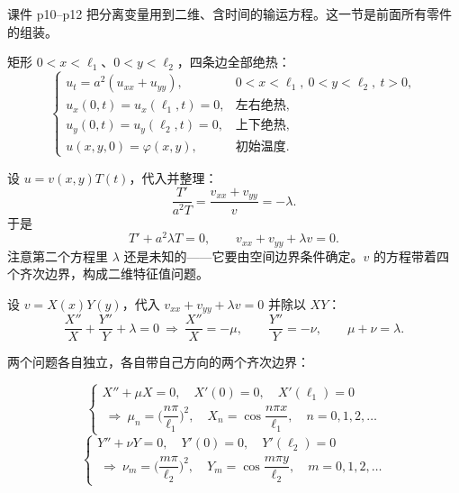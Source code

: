 \documentclass[11pt]{ctexart}
\let\origsubhdr\subhdr
\renewcommand{\subhdr}[1]{\par\needspace{3\baselineskip}\origsubhdr{#1}}
\let\orighdr\hdr
\renewcommand{\hdr}[2]{\par\needspace{6\baselineskip}\orighdr{#1}{#2}}
\begin{document}
\label{sec:s6}

课件 p10--p12 把分离变量用到二维、含时间的输运方程。这一节是前面所有零件的组装。


矩形 $0<x<\ell_1$、$0<y<\ell_2$，四条边全部绝热：
\begin{equation}
  \begin{cases}
    u_t=a^2(u_{xx}+u_{yy}), & 0<x<\ell_1,\ 0<y<\ell_2,\ t>0,\\
    u_x(0,t)=u_x(\ell_1,t)=0, & \text{左右绝热},\\
    u_y(0,t)=u_y(\ell_2,t)=0, & \text{上下绝热},\\
    u(x,y,0)=\varphi(x,y), & \text{初始温度}.
  \end{cases}
\end{equation}


设 $u=v(x,y)T(t)$，代入并整理：
\begin{equation}
  \frac{T'}{a^2T}=\frac{v_{xx}+v_{yy}}{v}=-\lambda .
\end{equation}
于是
\begin{equation}
  T'+a^2\lambda T=0,\qquad v_{xx}+v_{yy}+\lambda v=0 .
\end{equation}
注意第二个方程里 $\lambda$ 还是未知的——它要由空间边界条件确定。$v$ 的方程带着四个齐次边界，构成二维特征值问题。


设 $v=X(x)Y(y)$，代入 $v_{xx}+v_{yy}+\lambda v=0$ 并除以 $XY$：
\begin{equation}
  \frac{X''}{X}+\frac{Y''}{Y}+\lambda=0
  \ \Longrightarrow\
  \frac{X''}{X}=-\mu,\qquad \frac{Y''}{Y}=-\nu,\qquad \mu+\nu=\lambda .
\end{equation}

两个问题各自独立，各自带自己方向的两个齐次边界：

\begin{equation}
  \begin{cases}
    X''+\mu X=0,\quad X'(0)=0,\quad X'(\ell_1)=0\\
    \ \Longrightarrow\ \mu_n=\Big(\dfrac{n\pi}{\ell_1}\Big)^2,\quad X_n=\cos\dfrac{n\pi x}{\ell_1},\quad n=0,1,2,\dots
  \end{cases}
\end{equation}
\begin{equation}
  \begin{cases}
    Y''+\nu Y=0,\quad Y'(0)=0,\quad Y'(\ell_2)=0\\
    \ \Longrightarrow\ \nu_m=\Big(\dfrac{m\pi}{\ell_2}\Big)^2,\quad Y_m=\cos\dfrac{m\pi y}{\ell_2},\quad m=0,1,2,\dots
  \end{cases}
\end{equation}
\end{document}
